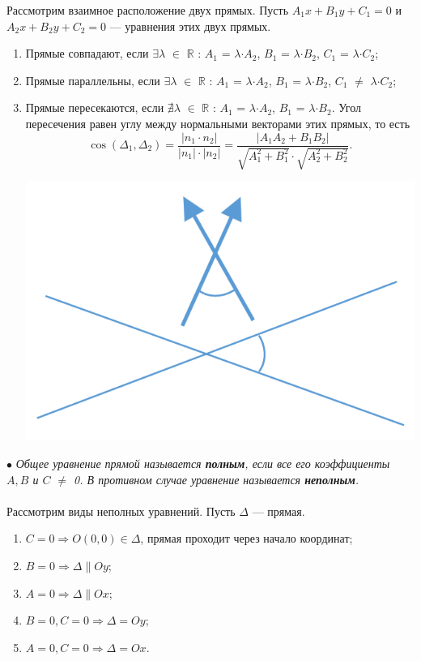 Рассмотрим взаимное расположение двух прямых. Пусть $A_1 x + B_1 y + C_1 = 0$ и $A_2 x + B_2 y + C_2 = 0$ --- уравнения этих двух прямых.
\begin{enumerate}
	\item Прямые совпадают, если $\exists$$\lambda$ $\in$ $\mathbb{R}$ : $A_1$ = $\lambda$$\cdot$$A_2$, $B_1$ = $\lambda$$\cdot$$B_2$, $C_1$ = $\lambda$$\cdot$$C_2$;
	\item Прямые параллельны, если $\exists$$\lambda$ $\in$ $\mathbb{R}$ : $A_1$ = $\lambda$$\cdot$$A_2$, $B_1$ = $\lambda$$\cdot$$B_2$, $C_1$ $\not=$ $\lambda$$\cdot$$C_2$;
	\item Прямые пересекаются, если $\nexists$$\lambda$ $\in$ $\mathbb{R}$ : $A_1$ = $\lambda$$\cdot$$A_2$, $B_1$ = $\lambda$$\cdot$$B_2$. Угол пересечения равен углу между нормальными векторами этих прямых, то есть$$\cos(\Delta_1, \Delta_2) = \dfrac{|n_1\cdot n_2|}{|n_1| \cdot |n_2|} = \dfrac{|A_1 A_2 + B_1 B_2|}{\sqrt{A_1^2 + B_1^2} \cdot \sqrt{A_2^2 + B_2^2}}.$$
	\begin{center}\includegraphics[scale=0.4]{images/corn3_1.png}\end{center}
\end{enumerate}
$\bullet$ \textit{Общее уравнение прямой называется \textbf{полным}, если все его коэффициенты $A, B$ и $C$ $\not=$ 0. В противном случае уравнение называется \textbf{неполным}.} \\\\
Рассмотрим виды неполных уравнений. Пусть $\Delta$ --- прямая.
\begin{enumerate}
	\item $C = 0 \Rightarrow O(0,0) \in \Delta$, прямая проходит через начало координат;
	\item $B = 0 \Rightarrow \Delta \parallel Oy$;
	\item $A = 0 \Rightarrow \Delta \parallel Ox$;
	\item $B = 0, C= 0 \Rightarrow \Delta = Oy$;
	\item $A = 0, C= 0 \Rightarrow \Delta = Ox$.
\end{enumerate}
